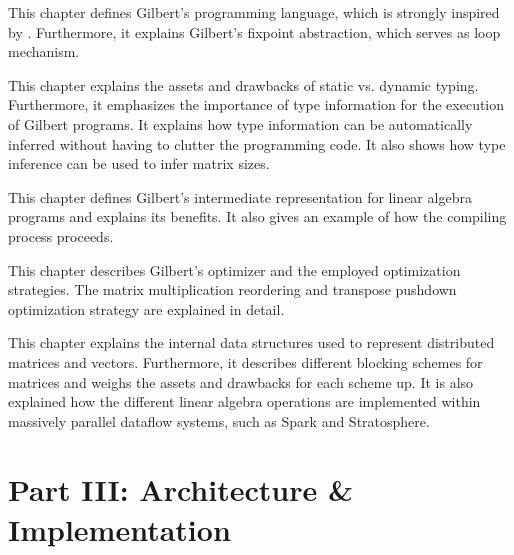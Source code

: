 
\noindent This chapter defines Gilbert's programming language, which is strongly inspired by \matlab. 
Furthermore, it explains Gilbert's fixpoint abstraction, which serves as loop mechanism.

\vspace{3mm}


\noindent This chapter explains the assets and drawbacks of static vs. dynamic typing.
Furthermore, it emphasizes the importance of type information for the execution of Gilbert programs. 
It explains how type information can be automatically inferred without having to clutter the programming code.
It also shows how type inference can be used to infer matrix sizes.

\vspace{3mm}


\noindent This chapter defines Gilbert's intermediate representation for linear algebra programs and explains its benefits.
It also gives an example of how the compiling process proceeds.

\vspace{3mm}


\noindent This chapter describes Gilbert's optimizer and the employed optimization strategies.
The matrix multiplication reordering and transpose pushdown optimization strategy are explained in detail.

 \vspace{3mm}


\noindent This chapter explains the internal data structures used to represent distributed matrices and vectors.
Furthermore, it describes different blocking schemes for matrices and weighs the assets and drawbacks for each scheme up.
It is also explained how the different linear algebra operations are implemented within massively parallel dataflow systems, such as Spark and Stratosphere.

\vspace{3mm}

\section*{Part III: Architecture \& Implementation}

